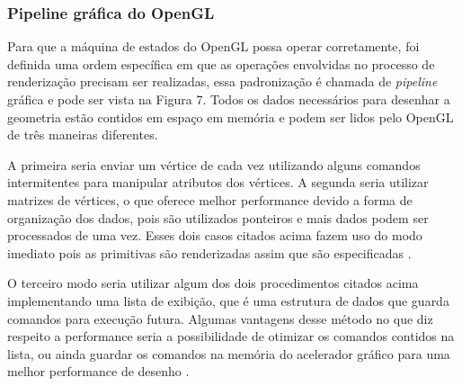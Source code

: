 \subsubsection{Pipeline gráfica do OpenGL}
\label{sec:pipeline-opengl}

Para que a máquina de estados do OpenGL possa operar corretamente, foi definida uma ordem específica em que as operações envolvidas no processo de renderização precisam ser realizadas, essa padronização é chamada de \textit{pipeline} gráfica \cite{GLSLBook} e pode ser vista na Figura 7. Todos os dados necessários para desenhar a geometria estão contidos em espaço em memória e podem ser lidos pelo OpenGL de três maneiras diferentes. 

\begin{figure}[h!]
	\centering
\end{figure}
\nocite{pipeline}

A primeira seria enviar um vértice de cada vez utilizando alguns comandos intermitentes para manipular atributos dos vértices. A segunda seria utilizar matrizes de vértices, o que oferece melhor performance devido a forma de organização dos dados, pois são utilizados ponteiros e mais dados podem ser processados de uma vez. Esses dois casos citados acima fazem uso do modo imediato pois as primitivas são renderizadas assim que são especificadas \cite{GLSLBook}. 

O terceiro modo seria utilizar algum dos dois procedimentos citados acima implementando uma lista de exibição, que é uma estrutura de dados que guarda comandos para execução futura. Algumas vantagens desse método no que diz respeito a performance seria a possibilidade de otimizar os comandos contidos na lista, ou ainda guardar os comandos na memória do acelerador gráfico para uma melhor performance de desenho \cite{GLSLBook}. 
	
